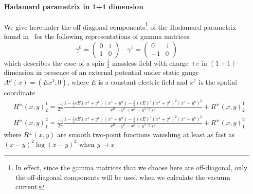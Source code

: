 \paragraph{Hadamard parametrix in 1+1 dimension}
We give hereunder the off-diagonal components\footnote{
In effect, since the gamma matrices that we choose here are off-diagonal, only the off-diagonal components will be used when we calculate the vacuum current.
}
 of the Hadamard parametrix found in~\cite{Zahn2015} for the following representations of gamma matrices
\begin{equation*}
\gamma^0 = \begin{pmatrix}
0 & 1 \\
1 & 0 \end{pmatrix}  \quad  \gamma^1 = \begin{pmatrix}
0  & 1 \\
-1 & 0
\end{pmatrix}
\end{equation*}
which describes the case of a spin-$\frac 1 2$ massless field with charge $+e$ in $(1+1)$-dimension in presence of an external potential under static gauge $A^\mu(x) = (Ex^1, 0)$, where $E$ is a constant electric field and $x^1$ is the spatial coordinate
\begin{equation}\label{vacuum-hadamardparametrix}
\begin{split}
& H^\pm (x, y)^1_2 = \frac{-i}{2\pi}\frac{1-\frac i 2 e E(x^1 + y^1)(x^0-y^0) 
- \frac 1 8 (eE)^2(x^1 + y^1)^2(x^0 - y^0)^2}{x^0 - y^0 + x^1 - y^1 \mp i \epsilon}  + R^\pm(x,y)^{1}_2\\
& H^\pm (x, y)^2_1 = \frac{-i}{2\pi}\frac{1-\frac i 2 e E(x^1 + y^1)(x^0-y^0) 
- \frac 1 8 (eE)^2(x^1 + y^1)^2(x^0 - y^0)^2}{x^0 - y^0 - x^1 + y^1 \mp i \epsilon} + R^\pm(x,y)^{2}_1
\end{split}
\end{equation}
where $R^\pm(x,y)$ are smooth two-point functions vanishing at least as fast as $(x-y)^2 \log(x-y)^2$  when $y\rightarrow x$
















